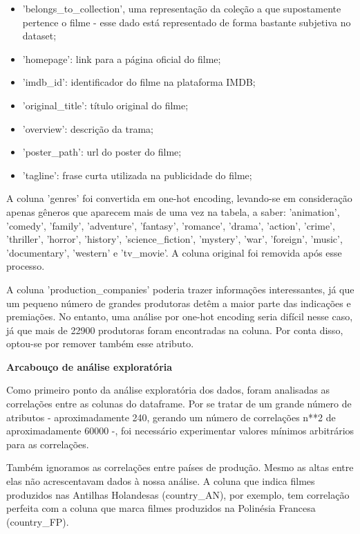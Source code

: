             \begin{itemize}
                \item 'belongs\_to\_collection', uma representação da coleção a que supostamente pertence o filme - esse dado está representado de forma bastante subjetiva no dataset;
                \item 'homepage': link para a página oficial do filme;
                \item 'imdb\_id': identificador do filme na plataforma IMDB;
                \item 'original\_title': título original do filme;
                \item 'overview': descrição da trama;
                \item 'poster\_path': url do poster do filme;
                \item 'tagline': frase curta utilizada na publicidade do filme;
            \end{itemize}

            A coluna 'genres' foi convertida em one-hot encoding, levando-se em consideração apenas gêneros que aparecem mais de uma vez na tabela, a saber: 'animation', 'comedy', 'family', 'adventure', 'fantasy', 'romance', 'drama', 'action', 'crime', 'thriller', 'horror', 'history', 'science\_fiction', 'mystery', 'war', 'foreign', 'music', 'documentary', 'western' e 'tv\_movie'. A coluna original foi removida após esse processo.

            A coluna 'production\_companies' poderia trazer informações interessantes, já que um pequeno número de grandes produtoras detêm a maior parte das indicações e premiações\cite{argon2020}. No entanto, uma análise por one-hot encoding seria difícil nesse caso, já que mais de 22900 produtoras foram encontradas na coluna. Por conta disso, optou-se por remover também esse atributo.\newline

            \textbf{Arcabouço de análise exploratória}\par
            Como primeiro ponto da análise exploratória dos dados, foram analisadas as correlações entre as colunas do dataframe. Por se tratar de um grande número de atributos - aproximadamente 240, gerando um número de correlações n**2 de aproximadamente 60000 -, foi necessário experimentar valores mínimos arbitrários para as correlações.\par

            Também ignoramos as correlações entre países de produção. Mesmo as altas entre elas não acrescentavam dados à nossa análise. A coluna que indica filmes produzidos nas Antilhas Holandesas (country\_AN), por exemplo, tem correlação perfeita com a coluna que marca filmes produzidos na Polinésia Francesa (country\_FP).\par

